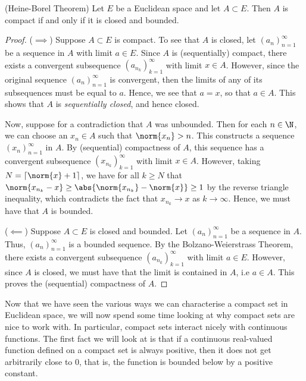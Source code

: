  \begin{theorem}
   (Heine-Borel Theorem) Let \( E \) be a Euclidean space and let \( A\subset E \). Then \( A \) is compact if and only if it is closed and bounded.
 \end{theorem}
 \begin{proof}
   (\( \implies \)) Suppose \( A\subset E \) is compact. To see that \( A \) is closed, let \( (a_n)_{n=1}^\infty \) be a sequence in \( A \) with limit \( a\in E \). Since \( A \) is (sequentially) compact, there exists a convergent subsequence \( (a_{n_k})_{k=1}^\infty \) with limit \( x\in A \). However, since the original sequence \( (a_n)_{n=1}^\infty \) is convergent, then the limits of any of its subsequences must be equal to \( a \). Hence, we see that \( a=x \), so that \( a\in A \). This shows that \( A \) is \emph{sequentially closed}, and hence closed.

   \vspace{3mm}

   Now, suppose for a contradiction that \( A \) was unbounded. Then for each \( n\in\N \), we can choose an \( x_n\in A \) such that \( \norm{x_n}>n \). This constructs a sequence \( (x_n)_{n=1}^\infty \) in \( A \). By (sequential) compactness of \( A \), this sequence has a convergent subsequence \( (x_{n_k})_{k=1}^\infty \) with limit \( x\in A \). However, taking \( N=\lceil\norm{x}+1\rceil \), we have for all \( k\geq N \) that \( \norm{x_{n_k}-x}\geq\abs{\norm{x_{n_k}}-\norm{x}}\geq 1 \) by the reverse triangle inequality, which contradicts the fact that \( x_{n_k}\to x \) as \( k\to\infty \). Hence, we must have that \( A \) is bounded.

   \vspace{3mm}

   (\( \impliedby \)) Suppose \( A\subset E \) is closed and bounded. Let \( (a_n)_{n=1}^\infty \) be a sequence in \( A \). Thus, \( (a_n)_{n=1}^\infty \) is a bounded sequence. By the Bolzano-Weierstrass Theorem, there exists a convergent subsequence \( (a_{n_k})_{k=1}^\infty \) with limit \( a\in E \). However, since \( A \) is closed, we must have that the limit is contained in \( A \), i.e \( a\in A \). This proves the (sequential) compactness of \( A \).
 \end{proof}

 Now that we have seen the various ways we can characterise a compact set in Euclidean space, we will now spend some time looking at why compact sets are nice to work with. In particular, compact sets interact nicely with continuous functions. The first fact we will look at is that if a continuous real-valued function defined on a compact set is always positive, then it does not get arbitrarily close to 0, that is, the function is bounded below by a positive constant.

